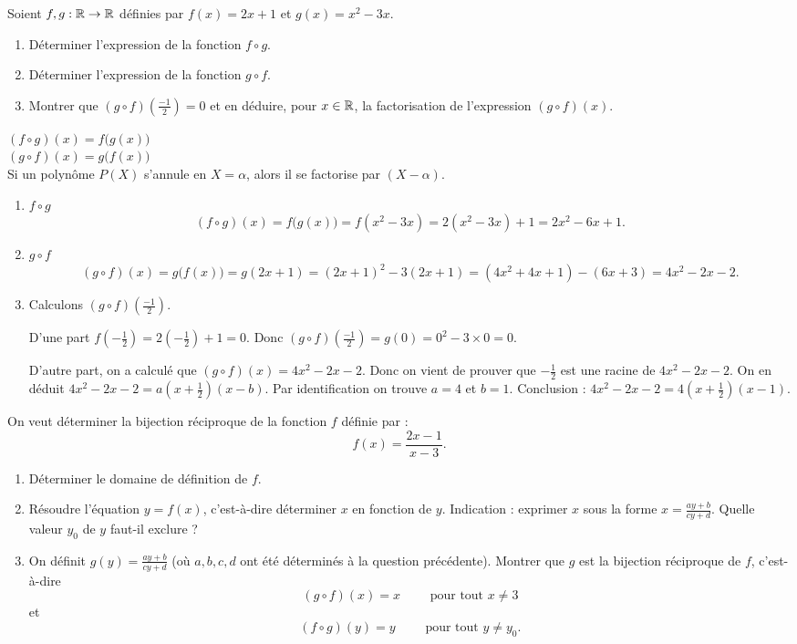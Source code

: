 \documentclass[11pt,class=report,crop=false]{standalone}
\begin{document}
\exercice{}
\enonce
Soient $f,g : \mathbb{R} \to \mathbb{R}$ définies par $f(x)=2x+1$ et $g(x)=x^2-3x$.
\begin{enumerate}
    \item Déterminer l'expression de la fonction $f \circ g$.
    \item Déterminer l'expression de la fonction $g \circ f$.
    \item Montrer que $(g\circ f)(\frac{-1}{2})=0$ et en déduire, pour $x\in \mathbb{R}$, la factorisation de l'expression $(g \circ f)(x)$.      
\end{enumerate} 
\finenonce

\indication
$(f \circ g)(x) = f \big( g(x) \big)$ \\
$(g \circ f)(x) = g \big( f(x) \big)$ \\
Si un polynôme $P(X)$ s'annule en $X=\alpha$, alors il se factorise par $(X-\alpha)$.
\finindication

\correction
\sauteligne
\begin{enumerate}
    \item $f \circ g$
    $$(f \circ g)(x) = f \big( g(x) \big) = f(x^2-3x) = 2(x^2-3x) + 1 = 2x^2-6x + 1.$$
    
    
    \item $g \circ f$
$$(g \circ f)(x) = g \big( f(x) \big) = g(2x+1) = (2x+1)^2 -3(2x+1) = (4x^2+4x+1) - (6x+3) = 4x^2-2x -2.$$

   \item Calculons  $(g \circ f)( \tfrac{-1}{2} )$.
   
   D'une part $f(-\tfrac12) = 2 (-\tfrac12) + 1 = 0$. 
   Donc $(g \circ f)( \tfrac{-1}{2} ) = g(0) =0^2 - 3 \times 0 = 0$.
   
   D'autre part, on a calculé que $(g \circ f)(x) = 4x^2-2x -2$. Donc on vient de prouver que 
   $-\tfrac 12 $ est une racine de $4x^2-2x -2$. 
   On en déduit $4x^2-2x -2 = a(x+\tfrac12)(x-b)$. Par identification on trouve $a=4$ et $b=1$.
   Conclusion : $4x^2-2x -2 = 4(x+\tfrac12)(x-1)$.
\end{enumerate}
\fincorrection
\finexercice


\exercice{}
\enonce
On veut déterminer la bijection réciproque de la fonction $f$ définie par :
$$f(x) = \frac{2x-1}{x-3}.$$
\begin{enumerate}
    \item Déterminer le domaine de définition de $f$.
    
    \item Résoudre l'équation $y = f(x)$, c'est-à-dire déterminer $x$ en fonction de $y$.   
    Indication : exprimer $x$ sous la forme $x = \frac{ay+b}{cy+d}$.
    Quelle valeur $y_0$ de $y$ faut-il exclure ?
    
    \item On définit $g(y) = \frac{ay+b}{cy+d}$ (où $a,b,c,d$ ont été déterminés à la question précédente). Montrer que $g$ est la bijection réciproque de $f$, c'est-à-dire 
    $$(g \circ f)(x) = x  \qquad \text{ pour tout } x \neq 3$$
    et 
    $$(f \circ g)(y) = y  \qquad \text{ pour tout } y \neq y_0.$$
\end{enumerate} 
\finenonce
\end{document}
